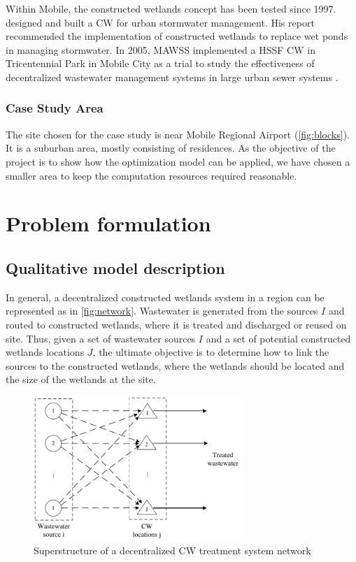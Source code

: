 \documentclass[preprint,12pt,authoryear]{elsarticle}
\begin{document}
Within Mobile, the constructed wetlands concept has been tested since 1997. \cite{surrency1997} designed and built a CW for urban stormwater management. His report recommended the implementation of constructed wetlands to replace wet ponds in managing stormwater. In 2005, MAWSS implemented a HSSF CW in Tricentennial Park in Mobile City as a trial to study the effectiveness of decentralized wastewater management systems in large urban sewer systems \cite{mawss2005}.


\subsubsection{Case Study Area}

The site chosen for the case study is near Mobile Regional Airport (\autoref{fig:blocks}). It is a suburban area, mostly consisting of residences. As the objective of the project is to show how the optimization model can be applied, we have chosen a smaller area to keep the computation resources required reasonable. 

\section{Problem formulation}\label{section:problem}
\subsection{Qualitative model description}

In general, a decentralized constructed wetlands system in a region can be represented as in \autoref{fig:network}. Wastewater is generated from the sources $I$ and routed to constructed wetlands, where it is treated and discharged or reused on site. Thus, given a set of wastewater sources $I$ and a set of potential constructed wetlands locations $J$, the ultimate objective is to determine how to link the sources to the constructed wetlands, where the wetlands should be located and the size of the wetlands at the site. 

\begin{figure}[!tpb]
	\centering
	\includegraphics[width=0.7\textwidth]{CWnetwork.pdf}
	\caption{Superstructure of a decentralized CW treatment system network}
	\label{fig:network}
\end{figure}
\end{document}
